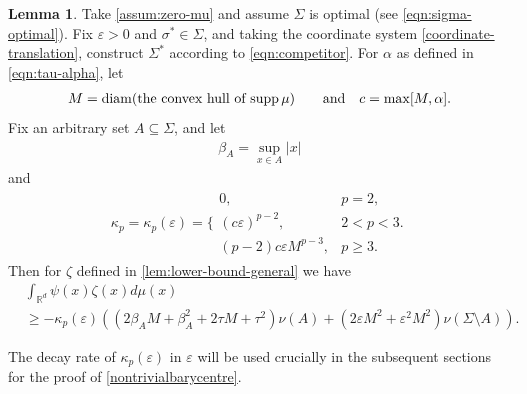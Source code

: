 \documentclass[preprint, reqno]{amsart}
\DeclareMathOperator*{\supp}{supp}
\DeclareMathOperator*{\diam}{diam}
\renewcommand{\epsilon}{\varepsilon}
\renewcommand{\subset}{\subseteq}
\theoremstyle{definition}
\newtheorem{lemma}[definition]{Lemma}
\numberwithin{equation}{section}
\begin{document}
\begin{lemma}\label{lem:psi-lowerbound}
  Take \eqref{assum:zero-mu} and assume $\Sigma$ is optimal (see
  \eqref{eqn:sigma-optimal}). Fix $\epsilon>0$ and $\sigma^*\in
  \Sigma$, and taking the coordinate system
  \eqref{coordinate-translation}, construct $\Sigma^*$ according to
  \eqref{eqn:competitor}. For $\alpha$ as defined in
  \eqref{eqn:tau-alpha}, let
  \begin{align}\label{eqn:Mandc}
    M =  \diam(\hbox{the convex
    hull of $\supp \mu$})
    \qquad \hbox{and}  \ \ \   c=\max[M, \alpha].
  \end{align}
  Fix an arbitrary set $A \subset \Sigma$, and let
  \begin{align}\label{eqn:beta}
    \beta_A  = \sup_{x\in A} |x|
  \end{align}
  and
  \begin{align}\label{eq:kappa}
    \kappa_p=\kappa_p(\epsilon) = \Bigg\{ \begin{matrix}
      0, & p =2, \\
      (c\epsilon)^{p-2}, & 2 < p < 3. \\
      (p-2)c\epsilon M^{p-3}, & p \geq 3.
    \end{matrix}
  \end{align}
  Then for $\zeta$ defined in \cref{lem:lower-bound-general} we have
  \begin{align}\label{secondterm}
    &\int_{\mathbb{R}^d}\psi(x)\zeta(x) d\mu(x)\\\nonumber
    &\geq - \kappa_p (\epsilon)\left((2\beta_A M + \beta_A^2 + 2\tau M
      + \tau^2)\nu(A) + (2\epsilon M^2 + \epsilon^2 M^2)\nu(\Sigma
      \setminus A)\right).
  \end{align}
\end{lemma}
The decay rate of $\kappa_p(\epsilon)$ in $\epsilon$ will be used
crucially in the subsequent sections for the proof of
\cref{nontrivialbarycentre}.
\end{document}
